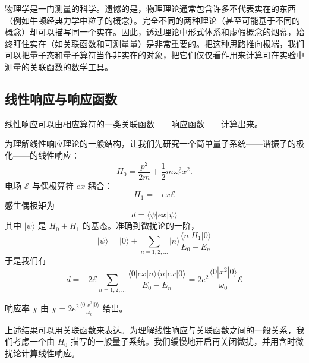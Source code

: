 物理学是一门测量的科学。遗憾的是，物理理论通常包含许多不代表实在的东西（例如牛顿经典力学中粒子的概念）。完全不同的两种理论（甚至可能基于不同的概念）却可以描写同一个实在。因此，透过理论中形式体系和虚假概念的烟幕，始终盯住实在（如关联函数和可测量量）是非常重要的。把这种思路推向极端，我们可以把量子态和量子算符当作非实在的对象，把它们仅仅看作用来计算可在实验中测量的关联函数的数学工具。

\subsection{线性响应与响应函数}

\begin{keypoints}
\item 线性响应可以由相应算符的一类关联函数——响应函数——计算出来。
\end{keypoints}

为理解线性响应理论的一般结构，让我们先研究一个简单量子系统——谐振子的极化——的线性响应：
\begin{equation*}
H_0=\frac{p^2}{2m}+\frac{1}{2}m\omega_0^2x^2.
\end{equation*}
电场 $\mathcal{E}$ 与偶极算符 $ex$ 耦合：
\begin{equation*}
H_1=-ex\mathcal{E}
\end{equation*}
感生偶极矩为
\begin{equation*}
d=\langle\psi|ex|\psi\rangle
\end{equation*}
其中 $|\psi\rangle$ 是 $H_0+H_1$ 的基态。准确到微扰论的一阶，
\begin{equation*}
|\psi\rangle=|0\rangle+\sum_{n=1,2,\dots}|n\rangle\frac{\langle n|H_1|0\rangle}{E_0-E_n}
\end{equation*}
于是我们有
\begin{equation*}
d=-2\mathcal{E}\sum_{n=1,2,\dots}\frac{\langle 0|ex|n\rangle\langle n|ex|0\rangle}{E_0-E_n}=2e^2\frac{\langle 0|x^2|0\rangle}{\omega_0}\mathcal{E}\tag{2.2.1}
\end{equation*}

响应率 $\chi$ 由 $\chi=2e^2\frac{\langle 0|x^2|0\rangle}{\omega_0}$ 给出。

上述结果可以用关联函数来表达。为理解线性响应与关联函数之间的一般关系，我们考虑一个由 $H_0$ 描写的一般量子系统。我们缓慢地开启再关闭微扰，并用含时微扰论计算线性响应。

